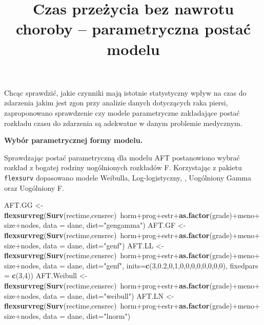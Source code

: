 \documentclass[]{article}
\title{Czas przeżycia bez nawrotu choroby -- parametryczna postać modelu}
\author{}
\date{}
\newenvironment{Shaded}{}{}
\newcommand{\KeywordTok}[1]{\textcolor[rgb]{0.00,0.44,0.13}{\textbf{{#1}}}}
\newcommand{\DataTypeTok}[1]{\textcolor[rgb]{0.56,0.13,0.00}{{#1}}}
\newcommand{\DecValTok}[1]{\textcolor[rgb]{0.25,0.63,0.44}{{#1}}}
\newcommand{\FloatTok}[1]{\textcolor[rgb]{0.25,0.63,0.44}{{#1}}}
\newcommand{\StringTok}[1]{\textcolor[rgb]{0.25,0.44,0.63}{{#1}}}
\newcommand{\NormalTok}[1]{{#1}}
\begin{document}
\maketitle


\thispagestyle{fancy}

Chcąc sprawdzić, jakie czynniki mają istotnie statystyczny wpływ na czas
do zdarzenia jakim jest zgon przy analizie danych dotyczących raka
piersi, zaproponowano sprawdzenie czy modele parametryczne zakładające
postać rozkładu czasu do zdarzenia są adekwatne w danym problemie
medycznym.

\textbf{Wybór parametrycznej formy modelu.}

Sprawdzając postać parametryczną dla modelu AFT postanowiono wybrać
rozkład z bogatej rodziny uogólnionych rozkładów F. Korzystając z
pakietu \texttt{flexsurv} dopasowano modele Weibulla, Log-logistyczny,
, Uogólniony Gamma oraz Uogólniony F.

\begin{Shaded}
\begin{Highlighting}[]
\NormalTok{AFT.GG <-}\StringTok{ }\KeywordTok{flexsurvreg}\NormalTok{(}\KeywordTok{Surv}\NormalTok{(rectime,censrec)~horm+prog+estr+}\KeywordTok{as.factor}\NormalTok{(grade)+meno+size+nodes, }
                             \DataTypeTok{data =} \NormalTok{dane, }\DataTypeTok{dist=}\StringTok{"gengamma"}\NormalTok{)}
\NormalTok{AFT.GF <-}\StringTok{ }\KeywordTok{flexsurvreg}\NormalTok{(}\KeywordTok{Surv}\NormalTok{(rectime,censrec)~horm+prog+estr+}\KeywordTok{as.factor}\NormalTok{(grade)+meno+size+nodes, }
                             \DataTypeTok{data =} \NormalTok{dane, }\DataTypeTok{dist=}\StringTok{"genf"}\NormalTok{)}
\NormalTok{AFT.LL <-}\StringTok{ }\KeywordTok{flexsurvreg}\NormalTok{(}\KeywordTok{Surv}\NormalTok{(rectime,censrec)~horm+prog+estr+}\KeywordTok{as.factor}\NormalTok{(grade)+meno+size+nodes, }
                             \DataTypeTok{data =} \NormalTok{dane, }\DataTypeTok{dist=}\StringTok{"genf"}\NormalTok{, }\DataTypeTok{inits=}\KeywordTok{c}\NormalTok{(}\DecValTok{3}\NormalTok{,}\FloatTok{0.2}\NormalTok{,}\DecValTok{0}\NormalTok{,}\DecValTok{1}\NormalTok{,}\DecValTok{0}\NormalTok{,}\DecValTok{0}\NormalTok{,}\DecValTok{0}\NormalTok{,}\DecValTok{0}\NormalTok{,}\DecValTok{0}\NormalTok{,}\DecValTok{0}\NormalTok{,}\DecValTok{0}\NormalTok{,}\DecValTok{0}\NormalTok{), }
                             \DataTypeTok{fixedpars =} \KeywordTok{c}\NormalTok{(}\DecValTok{3}\NormalTok{,}\DecValTok{4}\NormalTok{))}
\NormalTok{AFT.Weibull <-}\StringTok{ }\KeywordTok{flexsurvreg}\NormalTok{(}\KeywordTok{Surv}\NormalTok{(rectime,censrec)~horm+prog+estr+}\KeywordTok{as.factor}\NormalTok{(grade)+meno+}
\StringTok{                             }\NormalTok{size+nodes,}
                             \DataTypeTok{data =} \NormalTok{dane, }\DataTypeTok{dist=}\StringTok{"weibull"}\NormalTok{)}
\NormalTok{AFT.LN <-}\StringTok{ }\KeywordTok{flexsurvreg}\NormalTok{(}\KeywordTok{Surv}\NormalTok{(rectime,censrec)~horm+prog+estr+}\KeywordTok{as.factor}\NormalTok{(grade)+meno+size+nodes, }
                             \DataTypeTok{data =} \NormalTok{dane, }\DataTypeTok{dist=}\StringTok{"lnorm"}\NormalTok{)}
\end{Highlighting}
\end{Shaded}
\end{document}
